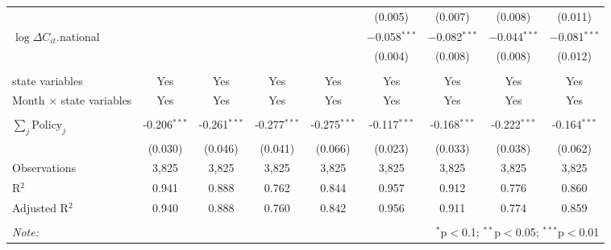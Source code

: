 \begin{tabular}{@{\extracolsep{1pt}}lcccccccc}
  &  &  &  &  & (0.005) & (0.007) & (0.008) & (0.011) \\ 
  $\log \Delta C_{it}$.national &  &  &  &  & $-$0.058$^{***}$ & $-$0.082$^{***}$ & $-$0.044$^{***}$ & $-$0.081$^{***}$ \\ 
  &  &  &  &  & (0.004) & (0.008) & (0.008) & (0.012) \\ 
 \hline \\[-1.8ex] 
state variables & Yes & Yes & Yes & Yes & Yes & Yes & Yes & Yes \\ 
Month $\times$ state variables & Yes & Yes & Yes & Yes & Yes & Yes & Yes & Yes \\ 
\hline \\[-1.8ex] 
$\sum_j \mathrm{Policy}_j$ & -0.206$^{***}$ & -0.261$^{***}$ & -0.277$^{***}$ & -0.275$^{***}$ & -0.117$^{***}$ & -0.168$^{***}$ & -0.222$^{***}$ & -0.164$^{***}$ \\ 
 & (0.030) & (0.046) & (0.041) & (0.066) & (0.023) & (0.033) & (0.038) & (0.062) \\ 
Observations & 3,825 & 3,825 & 3,825 & 3,825 & 3,825 & 3,825 & 3,825 & 3,825 \\ 
R$^{2}$ & 0.941 & 0.888 & 0.762 & 0.844 & 0.957 & 0.912 & 0.776 & 0.860 \\ 
Adjusted R$^{2}$ & 0.940 & 0.888 & 0.760 & 0.842 & 0.956 & 0.911 & 0.774 & 0.859 \\ 
\hline 
\hline \\[-1.8ex] 
\textit{Note:}  & \multicolumn{8}{r}{$^{*}$p$<$0.1; $^{**}$p$<$0.05; $^{***}$p$<$0.01} \\ 
\end{tabular} 